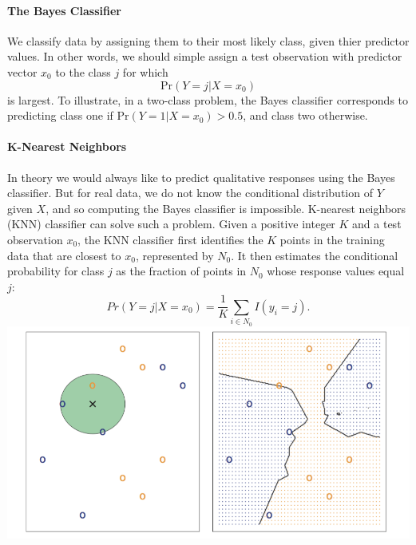 \documentclass{article}
\begin{document}
\paragraph{The Bayes Classifier}
We classify data by assigning them to their most likely class, given thier predictor values. In other words, we should simple assign a test observation with predictor vector $x_0$ to the class $j$ for which
\[
	\text{Pr}(Y = j | X = x_0)
\]
is largest. To illustrate, in a two-class problem, the Bayes classifier corresponds to predicting class one if $\text{Pr}(Y = 1 | X = x_0) > 0.5$, and class two otherwise.

\paragraph{K-Nearest Neighbors}
In theory we would always like to predict qualitative responses using the Bayes classifier. But for real data, we do not know the conditional distribution of $Y$ given $X$, and so computing the Bayes classifier is impossible. K-nearest neighbors (KNN) classifier can solve such a problem. Given a positive integer $K$ and a test observation $x_0$, the KNN classifier first identifies the $K$ points in the training data that are closest to $x_0$, represented by $N_0$. It then estimates the conditional probability for class $j$ as the fraction of points in $N_0$ whose response values equal $j$:
\[
	Pr(Y = j | X = x_0) = \frac{1}{K}\sum_{i\in N_0}I(y_i = j).
\]
\includegraphics[scale=0.8]{images/knn1.png} \\
\end{document}
